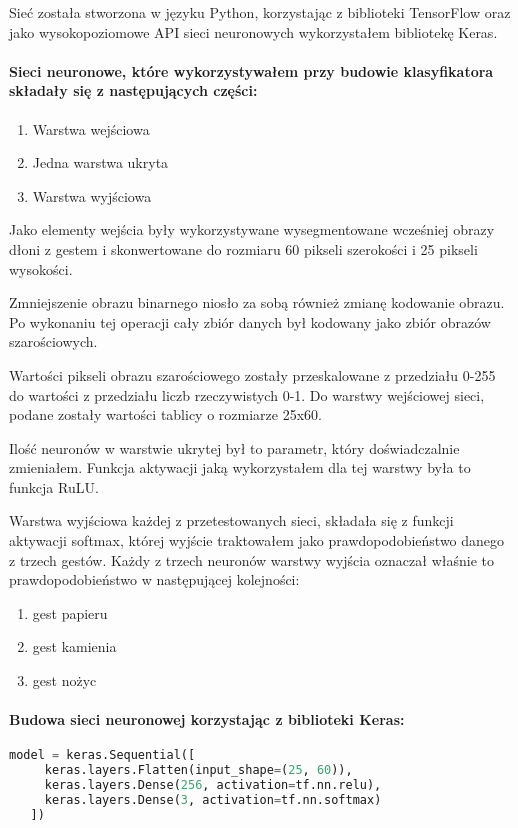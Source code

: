 \documentclass[a4paper,12pt,twoside,openany]{report}
\begin{document}
	Sieć została stworzona w języku Python, korzystając z biblioteki TensorFlow oraz jako wysokopoziomowe API sieci neuronowych wykorzystałem bibliotekę Keras.

	
	\paragraph{Sieci neuronowe, które wykorzystywałem przy budowie klasyfikatora składały się z następujących części:}
	\begin{enumerate}
		\item Warstwa wejściowa
		\item Jedna warstwa ukryta
		\item Warstwa wyjściowa
	\end{enumerate}
	
	Jako elementy wejścia były wykorzystywane wysegmentowane wcześniej obrazy dłoni z gestem i skonwertowane do rozmiaru 60 pikseli szerokości i 25 pikseli wysokości. 
	
	Zmniejszenie obrazu binarnego niosło za sobą również zmianę kodowanie obrazu. Po wykonaniu tej operacji cały zbiór danych był kodowany jako zbiór obrazów szarościowych.
		
	Wartości pikseli obrazu szarościowego zostały przeskalowane z przedziału 0-255 do wartości z przedziału liczb rzeczywistych 0-1. Do warstwy wejściowej sieci, podane zostały wartości tablicy o rozmiarze 25x60.
	
	Ilość neuronów w warstwie ukrytej był to parametr, który doświadczalnie zmieniałem. Funkcja aktywacji jaką wykorzystałem dla tej warstwy była to funkcja RuLU.

	Warstwa wyjściowa każdej z przetestowanych sieci, składała się z funkcji aktywacji softmax, której wyjście traktowałem jako prawdopodobieństwo danego z trzech gestów. Każdy z trzech neuronów warstwy wyjścia oznaczał właśnie to prawdopodobieństwo w następującej kolejności:
	\begin{enumerate}
		\item gest papieru
		\item gest kamienia
		\item gest nożyc
	\end{enumerate}

	\paragraph{Budowa sieci neuronowej korzystając z biblioteki Keras:}
	\begin{lstlisting}[language=Python]
   model = keras.Sequential([
     keras.layers.Flatten(input_shape=(25, 60)),
     keras.layers.Dense(256, activation=tf.nn.relu),
     keras.layers.Dense(3, activation=tf.nn.softmax)
   ])
	\end{lstlisting}
	
\end{document}
